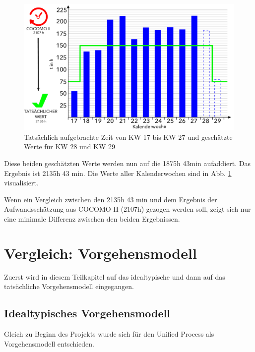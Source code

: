 \documentclass[../review_3.tex]{subfiles}
\begin{document}
\begin{figure} [h]
    \centering
    \includegraphics[width = 0.9\linewidth]{img/AufwandsschaetzungNeu.pdf}
    \caption{Tatsächlich aufgebrachte Zeit von KW 17 bis KW 27 und geschätzte Werte für KW 28 und KW 29}
    \label{aufw}
\end{figure}
Diese beiden geschätzten Werte werden nun auf die 1875h 43min aufaddiert. Das Ergebnis ist 2135h 43 min. Die Werte aller Kalenderwochen sind in Abb. \ref{aufw} visualisiert.

Wenn ein Vergleich zwischen den 2135h 43 min und dem Ergebnis der Aufwandsschätzung aus COCOMO II (2107h) gezogen werden soll, zeigt sich nur eine minimale Differenz zwischen den beiden Ergebnissen.

\section{Vergleich: Vorgehensmodell}

Zuerst wird in diesem Teilkapitel auf das idealtypische und dann auf das tatsächliche Vorgehensmodell eingegangen.

\subsection{Idealtypisches Vorgehensmodell}

Gleich zu Beginn des Projekts wurde sich für den Unified Process als Vorgehensmodell entschieden.
\end{document}
